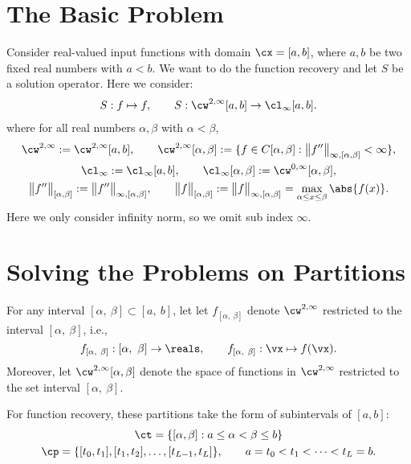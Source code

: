 \documentclass[]{elsarticle}
\theoremstyle{definition}
\theoremstyle{remark}
\begin{document}
\section{The Basic Problem}
Consider real-valued input functions with domain $\cx=[a,b]$, where $a, b$ be two fixed real numbers with $a<b$. We want to do the function recovery and let $S$ be a solution operator.  Here we consider:
\begin{align*}
S: f \mapsto f, \qquad S:\cw^{2,\infty}[a,b] \to \cl_{\infty}[a,b].
\end{align*}
where
for all real numbers $\alpha, \beta$ with $\alpha < \beta$,
\begin{gather*}
\cw^{2,\infty}:=\cw^{2,\infty}[a,b], \qquad \cw^{2,\infty}[\alpha,\beta]:=\{f\in C[\alpha,\beta]: \bigl \lVert f''\bigr \rVert_{\infty,[\alpha,\beta]} <\infty\}, \\
\cl_{\infty}:=\cl_{\infty}[a,b], \qquad
\cl_{\infty}[\alpha,\beta]:=\cw^{0,\infty}[\alpha,\beta],\\
\bigl \lVert f'' \bigr \rVert_{[\alpha,\beta]} :=  \bigl \lVert f'' \bigr \rVert_{\infty,[\alpha,\beta]}, \qquad
\bigl \lVert f \bigr \rVert_{[\alpha,\beta]} :=  \bigl \lVert f \bigr \rVert_{\infty,[\alpha,\beta]}= \max_{\alpha \le x  \le \beta} \abs{f(x)}. \end{gather*}
Here we only consider infinity norm, so we omit sub index $\infty.$

\section{Solving the Problems on Partitions}
For any interval $[\alpha, \ \beta] \subset [a, \ b]$, let let $f_{[\alpha, \ \beta]}$ denote $\cw^{2,\infty}$ restricted to the interval $[\alpha, \ \beta]$, i.e.,
\begin{equation*}
f_{[\alpha, \ \beta]}:[\alpha, \ \beta] \to \reals, \qquad f_{[\alpha, \ \beta]} :\vx \mapsto f(\vx).
\end{equation*}
Moreover, let $\cw^{2,\infty}[\alpha,\beta]$ denote the space of functions in $\cw^{2,\infty}$ restricted to the set interval $[\alpha, \ \beta]$.


For function recovery, these partitions take the form of subintervals of $[a,b]$:
\begin{gather*}
\ct=\{[\alpha,\beta] : a \le \alpha < \beta \le b \} \\
\cp=\{[t_0,t_1], [t_1,t_2],  \ldots, [t_{L-1},t_L]\}, \qquad a=t_0 < t_1 < \cdots < t_L=b.
\end{gather*}
\end{document}
